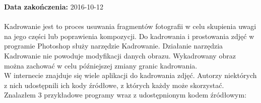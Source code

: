 \noindent\textbf{Data zakończenia:} 2016-10-12\\
\\

 Kadrowanie jest to proces usuwania fragmentów fotografii w celu skupienia uwagi na jego części lub poprawienia kompozycji. Do kadrowania i prostowania zdjęć w programie Photoshop służy narzędzie Kadrowanie. Działanie narzędzia Kadrowanie nie powoduje modyfikacji danych obrazu. Wykadrowany obraz można zachować w celu późniejszej zmiany granic kadrowania.\\

W internecie znajduje się wiele aplikacji do kadrowania zdjęć. Autorzy niektórych z nich udostępnili ich kody źródłowe, z których każdy może skorzystać.\\

Znalazłem 3 przykładowe programy wraz z udostępnionym kodem źródłowym:

